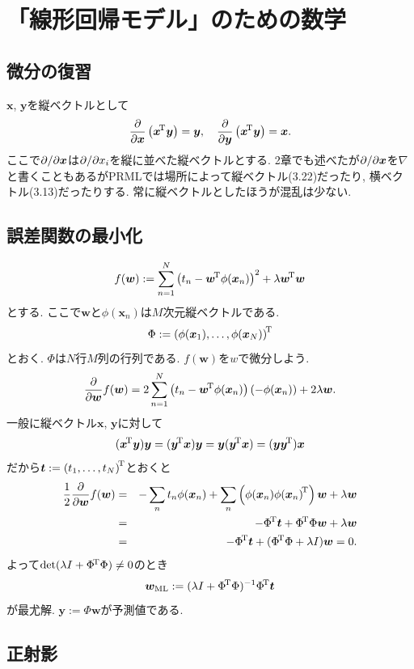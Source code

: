 \setcounter{chapter}{2}
\chapter{「線形回帰モデル」のための数学}
\section{微分の復習}
$\bm{x}$, $\bm{y}$を縦ベクトルとして
$$
\frac{\partial}{\partial \bm{x}} \left({\bm{x}}^{\!\mathrm{T}}\bm{y}\right) = \bm{y},\quad
\frac{\partial}{\partial \bm{y}} \left({\bm{x}}^{\!\mathrm{T}}\bm{y}\right) = \bm{x}.
$$
ここで$\partial/\partial \bm{x}$は$\partial/\partial x_i$を縦に並べた縦ベクトルとする.
2章でも述べたが$\partial/\partial \bm{x}$を$\nabla$と書くこともあるがPRMLでは場所によって縦ベクトル(3.22)だったり,
横ベクトル(3.13)だったりする. 常に縦ベクトルとしたほうが混乱は少ない.

\section{誤差関数の最小化}

$$
f(\bm{w}):=\sum_{n=1}^N\left(t_n - {\bm{w}}^{\!\mathrm{T}}\phi(\bm{x}_n)\right)^2+\lambda {\bm{w}}^{\!\mathrm{T}}\bm{w}
$$
とする. ここで$\bm{w}$と$\phi(\bm{x}_n)$は$M$次元縦ベクトルである.
$$
\Phi:={(\phi(\bm{x}_1), \ldots, \phi(\bm{x}_N))}^{\!\mathrm{T}}
$$
とおく. $\Phi$は$N$行$M$列の行列である. $f(\bm{w})$を$w$で微分しよう.
$$
\frac{\partial}{\partial \bm{w}}f(\bm{w})
 = 2\sum_{n=1}^N\left(t_n - {\bm{w}}^{\!\mathrm{T}}\phi(\bm{x}_n)\right)(-\phi(\bm{x}_n)) +2\lambda \bm{w}.
$$
一般に縦ベクトル$\bm{x}$, $\bm{y}$に対して
$$
({\bm{x}}^{\!\mathrm{T}}\bm{y})\bm{y}
 =({\bm{y}}^{\!\mathrm{T}}{\bm{x}})\bm{y}
 =\bm{y}({\bm{y}}^{\!\mathrm{T}}\bm{x})
 =(\bm{y}{\bm{y}}^{\!\mathrm{T}})\bm{x}
$$
だから$\bm{t}:={(t_1, \ldots, t_N)}^{\!\mathrm{T}}$とおくと
\begin{eqnarray*}
\frac{1}{2}\frac{\partial}{\partial \bm{w}}f(\bm{w})
 &=& -\sum_n t_n \phi(\bm{x}_n) + \sum_n \left(\phi(\bm{x}_n){\phi(\bm{x}_n)}^{\!\mathrm{T}}\right)\bm{w} + \lambda \bm{w}\\
 &=& -{\Phi}^{\!\mathrm{T}} \bm{t} + {\Phi}^{\!\mathrm{T}}\Phi \bm{w} + \lambda \bm{w}\\
 &=& -{\Phi}^{\!\mathrm{T}} \bm{t} + ({\Phi}^{\!\mathrm{T}}\Phi + \lambda I)\bm{w}=0.
\end{eqnarray*}
よって$\det(\lambda I + {\Phi}^{\!\mathrm{T}}\Phi)\ne0$のとき
$$\bm{w}_{\text{ML}}:=(\lambda I + {\Phi}^{\!\mathrm{T}}\Phi)^{-1}{\Phi}^{\!\mathrm{T}}\bm{t}$$
が最尤解. $\bm{y}:=\Phi \bm{w}$が予測値である.

\section{正射影}

